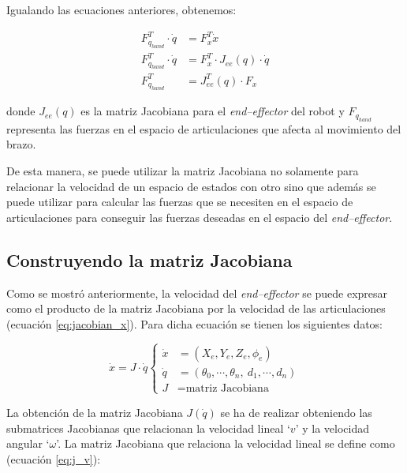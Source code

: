 Igualando las ecuaciones anteriores, obtenemos:

\begin{align*}
    F^T_{q_{hand}} \cdot{} \dot{q} & = F^T_x \dot{x}                                    \\
    F^T_{q_{hand}} \cdot{} \dot{q} & = F^T_x \cdot{} J_{ee}\left(q\right) \cdot \dot{q} \\
    F^T_{q_{hand}}                 & = J^T_{ee}\left(q\right) \cdot F_x
\end{align*}

donde $J_{ee}\left(q\right)$ es la matriz Jacobiana para el \textit{end--effector}
del robot y $F_{q_{hand}}$ representa las fuerzas en el espacio de articulaciones
que afecta al movimiento del brazo.

De esta manera, se puede utilizar la matriz Jacobiana no solamente para relacionar
la velocidad de un espacio de estados con otro sino que además se puede utilizar
para calcular las fuerzas que se necesiten en el espacio de articulaciones para conseguir
las fuerzas deseadas en el espacio del \textit{end--effector}.

\subsection*{Construyendo la matriz Jacobiana}
Como se mostró anteriormente, la velocidad del \textit{end--effector} se puede
expresar como el producto de la matriz Jacobiana por la velocidad de las articulaciones
(ecuación \ref{eq:jacobian_x}). Para dicha ecuación se tienen los siguientes datos:

\begin{equation*}
    \dot{x} = J \cdot \dot{q}
    \left\{\begin{aligned}
        \dot{x} & = \left(X_e, Y_e, Z_e, \phi_e\right)                        \\
        \dot{q} & = \left(\theta_0, \cdots, \theta_n,~d_1, \cdots, d_n\right) \\
        J       & = \text{matriz Jacobiana}
    \end{aligned}\right.
\end{equation*}

La obtención de la matriz Jacobiana $J\left(\dot{q}\right)$ se ha de realizar obteniendo
las submatrices Jacobianas que relacionan la velocidad lineal `$v$' y la velocidad angular
`$\omega$'. La matriz Jacobiana que relaciona la velocidad lineal se define como
(ecuación \ref{eq:j_v}):

